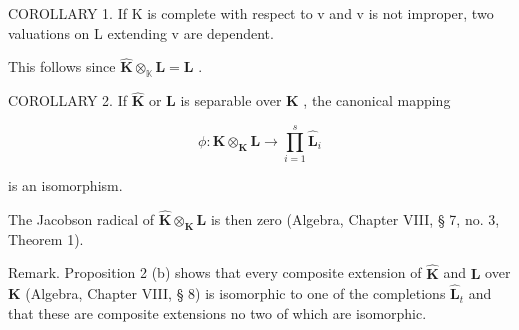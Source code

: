 COROLLARY 1. If K is complete with respect to v and v is not improper, two valuations on L extending v are dependent.

This follows since \(\hat{\mathbf{K}}\otimes_{\mathbb{K}}\mathbf{L} = \mathbf{L}\) .

COROLLARY 2. If \(\hat{\mathbf{K}}\) or \(\mathbf{L}\) is separable over \(\mathbf{K}\) , the canonical mapping

\[
\phi : \hat {\mathbf {K}} \otimes_ {\mathbf {K}} \mathbf {L} \rightarrow \prod_ {i = 1} ^ {s} \hat {\mathbf {L}} _ {i}
\]

is an isomorphism.

The Jacobson radical of \(\hat{\mathbf{K}}\otimes_{\mathbf{K}}\mathbf{L}\) is then zero (Algebra, Chapter VIII, § 7, no. 3, Theorem 1).

Remark. Proposition 2 (b) shows that every composite extension of \(\hat{\mathbf{K}}\) and \(\mathbf{L}\) over \(\mathbf{K}\) (Algebra, Chapter VIII, § 8) is isomorphic to one of the completions \(\hat{\mathbf{L}}_t\) and that these are composite extensions no two of which are isomorphic.
